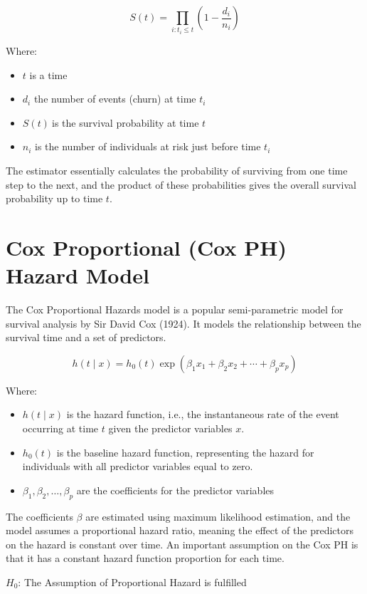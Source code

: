 \documentclass[12pt]{report}
\begin{document}
	\[S\left(t\right)=\prod_{i:t_i\le t}\left(1-\frac{d_i}{n_i}\right)\]
	
	Where:
	\begin{itemize}
		\item \(t\) is a time
		\item \(d_i \) the number of events (churn) at time \(t_i\)
		\item \(S\left(t\right)\ \)is the survival probability at time \(t\)
		\item \(n_i\) is the number of individuals at risk just before time \(t_i\)
	\end{itemize}
	The estimator essentially calculates the probability of surviving from one time step to the next, and the product of these probabilities gives the overall survival probability up to time \(t\).
	
	\section{Cox Proportional (Cox PH) Hazard Model}
	
	The Cox Proportional Hazards model is a popular semi-parametric model for survival analysis by Sir David Cox (1924). It models the relationship between the survival time and a set of predictors.
	
	\[
	h\left(t \mid x\right) = h_0(t) \exp(\beta_1 x_1 + \beta_2 x_2 + \cdots + \beta_p x_p)
	\]
	
	Where:
	\begin{itemize}
		\item \(h(t\mid x)\) is the hazard function, i.e., the instantaneous rate of the event occurring at time \(t\) given the predictor variables \(x\).
		\item \(h_0\left(t\right)\) is the baseline hazard function, representing the hazard for individuals with all predictor variables equal to zero.
		\item \(\beta_1,\beta_2,\ldots,\beta_p\) are the coefficients for the predictor variables
	\end{itemize}
	
	The coefficients \(\beta\) are estimated using maximum likelihood estimation, and the model assumes a proportional hazard ratio, meaning the effect of the predictors on the hazard is constant over time.
	An important assumption on the Cox PH is that it has a constant hazard function proportion for each time.
	
	
	
	\(H_0\): The Assumption of Proportional Hazard is fulfilled 
	
\end{document}
